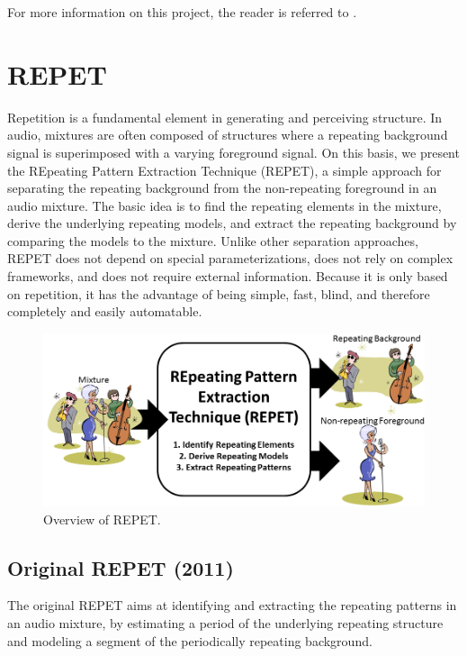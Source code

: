 \documentclass{article}
\begin{document}
For more information on this project, the reader is referred to \cite{article_rafii_nov2024}.


\section{REPET}
\label{sec:repet}

Repetition is a fundamental element in generating and perceiving structure. In audio, mixtures are often composed of structures where a repeating background signal is superimposed with a varying foreground signal. On this basis, we present the REpeating Pattern Extraction Technique (REPET), a simple approach for separating the repeating background from the non-repeating foreground in an audio mixture. The basic idea is to find the repeating elements in the mixture, derive the underlying repeating models, and extract the repeating background by comparing the models to the mixture. Unlike other separation approaches, REPET does not depend on special parameterizations, does not rely on complex frameworks, and does not require external information. Because it is only based on repetition, it has the advantage of being simple, fast, blind, and therefore completely and easily automatable.

\begin{figure}[!htb]
\centering
\includegraphics[width=\columnwidth]{Images/repet.png}
\caption{Overview of REPET.}
\label{fig:repet}
\end{figure}

\subsection{Original REPET (2011)}
\label{ssec:repet_original}

The original REPET aims at identifying and extracting the repeating patterns in an audio mixture, by estimating a period of the underlying repeating structure and modeling a segment of the periodically repeating background.
\end{document}
